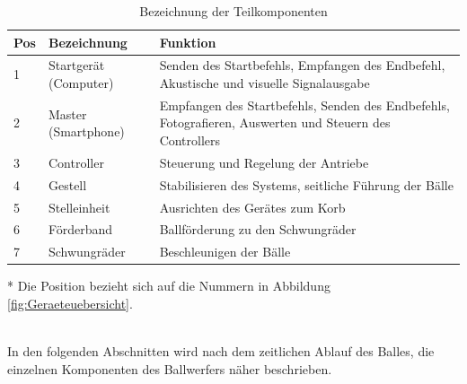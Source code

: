\begin{table}[h!]
	\begin{threeparttable} 
		\begin{tabular}{p{8mm}p{3.5cm}p{8.1cm}}
		    \textbf{Pos}\tnote{*} & \textbf{Bezeichnung} & \textbf{Funktion} \\ 
			\hline\rule{0pt}{11pt} 1 & Startgerät (Computer) & Senden des Startbefehls, Empfangen des Endbefehl, 
			Akustische und visuelle Signalausgabe \\ 
			    \rule{0pt}{11pt}   2 & Master  (Smartphone) & Empfangen des Startbefehls, Senden des Endbefehls,
			Fotografieren, Auswerten und Steuern des Controllers \\ 
			  \rule{0pt}{11pt}     3 & Controller & Steuerung und Regelung der Antriebe \\ 
			  \rule{0pt}{11pt}     4 & Gestell & Stabilisieren des Systems,	seitliche Führung der Bälle \\ 
			   \rule{0pt}{11pt}    5 & Stelleinheit & Ausrichten des Gerätes zum Korb \\ 
			   \rule{0pt}{11pt}    6 & Förderband & Ballförderung zu den Schwungräder \\ 
			   \rule{0pt}{11pt}    7 & Schwungräder & Beschleunigen der Bälle \\ 
		\end{tabular} 
		\centering
		\caption{Bezeichnung der Teilkomponenten}	
		\label{tab:BezTeilkomponenten}
		\begin{tablenotes}\footnotesize 
			\item[*] Die Position bezieht sich auf die Nummern in Abbildung \ref{fig:Geraeteuebersicht}.
		\end{tablenotes}
	\end{threeparttable} 
\end{table}\\
In den folgenden Abschnitten wird nach dem zeitlichen Ablauf des Balles, die einzelnen Komponenten des Ballwerfers näher beschrieben. 